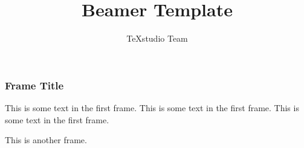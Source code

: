 \documentclass{beamer}
\title{Beamer Template}
\author{TeXstudio Team}
\institute{Your institue}
\begin{document}
\begin{frame}[plain]
    \maketitle
\end{frame}
\begin{frame}
    \frametitle{Frame Title}
    This is some text in the first frame. This is some text in the first frame. This is some text in the first frame.
\end{frame}
\begin{frame}
	This is another frame.
\end{frame}
\end{document}
